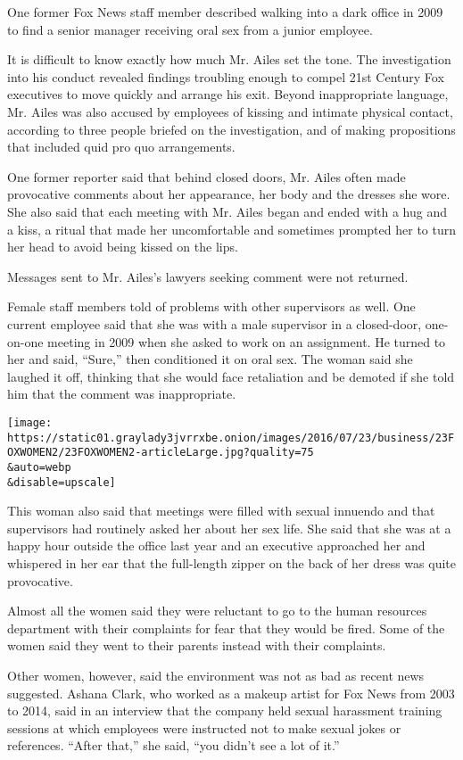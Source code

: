 One former Fox News staff member described walking into a dark office in
2009 to find a senior manager receiving oral sex from a junior employee.

It is difficult to know exactly how much Mr. Ailes set the tone. The
investigation into his conduct revealed findings troubling enough to
compel 21st Century Fox executives to move quickly and arrange his exit.
Beyond inappropriate language, Mr. Ailes was also accused by employees
of kissing and intimate physical contact, according to three people
briefed on the investigation, and of making propositions that included
quid pro quo arrangements.

One former reporter said that behind closed doors, Mr. Ailes often made
provocative comments about her appearance, her body and the dresses she
wore. She also said that each meeting with Mr. Ailes began and ended
with a hug and a kiss, a ritual that made her uncomfortable and
sometimes prompted her to turn her head to avoid being kissed on the
lips.

Messages sent to Mr. Ailes's lawyers seeking comment were not returned.

Female staff members told of problems with other supervisors as well.
One current employee said that she was with a male supervisor in a
closed-door, one-on-one meeting in 2009 when she asked to work on an
assignment. He turned to her and said, ``Sure,'' then conditioned it on
oral sex. The woman said she laughed it off, thinking that she would
face retaliation and be demoted if she told him that the comment was
inappropriate.

\texttt{[image: https://static01.graylady3jvrrxbe.onion/images/2016/07/23/business/23FOXWOMEN2/23FOXWOMEN2-articleLarge.jpg?quality=75\\\&auto=webp\\\&disable=upscale]}

This woman also said that meetings were filled with sexual innuendo and
that supervisors had routinely asked her about her sex life. She said
that she was at a happy hour outside the office last year and an
executive approached her and whispered in her ear that the full-length
zipper on the back of her dress was quite provocative.

Almost all the women said they were reluctant to go to the human
resources department with their complaints for fear that they would be
fired. Some of the women said they went to their parents instead with
their complaints.

Other women, however, said the environment was not as bad as recent news
suggested. Ashana Clark, who worked as a makeup artist for Fox News from
2003 to 2014, said in an interview that the company held sexual
harassment training sessions at which employees were instructed not to
make sexual jokes or references. ``After that,'' she said, ``you didn't
see a lot of it.''

